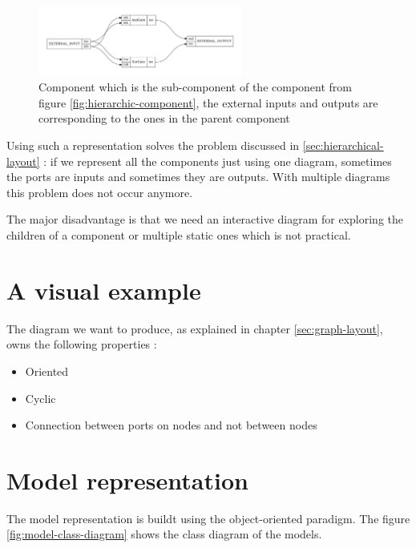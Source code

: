 \begin{figure}[H]
  \centering
  \includegraphics[width=0.6\textwidth]{img/AndXorGate.pdf}
  \caption[SpinalHDL Component inside an another]{Component which is the
    sub-component of the component from figure \ref{fig:hierarchic-component},
    the external inputs and outputs are corresponding to the ones in the parent component}
  \label{fig:and-xor-gate}
\end{figure}

Using such a representation solves the problem discussed in
\ref{sec:hierarchical-layout} : if we represent all the components just using
one diagram, sometimes the ports are inputs and sometimes they are outputs. With
multiple diagrams this problem does not occur anymore.

The major disadvantage is that we need an interactive diagram for exploring
the children of a component or multiple static ones which is not practical.

\section{A visual example}

The diagram we want to produce, as explained in chapter \ref{sec:graph-layout}, owns the following properties :
\begin{itemize}
  \item Oriented
  \item Cyclic
  \item Connection between ports on nodes and not between nodes
\end{itemize}

\section{Model representation}
\label{sec:model-representation} 

The model representation is buildt using the object-oriented paradigm. The
figure \ref{fig:model-class-diagram} shows the class diagram of the models.

